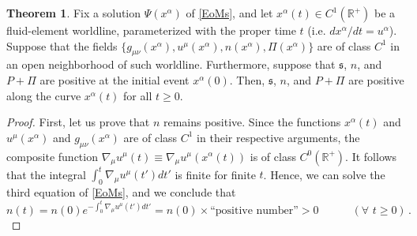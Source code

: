 \documentclass[a4paper, amsfonts, amssymb, amsmath, reprint, showkeys, nofootinbib, twoside,notitlepage,onecolumn]{revtex4-2}
\newcommand{\spc}{\quad \quad \quad}
\newcommand{\s}{{\mathfrak{s}}}
\theoremstyle{definition}
\theoremstyle{theorem}
\newtheorem{theorem}{Theorem}
\theoremstyle{corollary}
\begin{document}
\begin{theorem}\label{theo1} 
Fix a solution $\Psi(x^\alpha)$ of \eqref{EoMs}, and let $x^\alpha(t) \in C^1(\mathbb{R}^+)$ be a fluid-element worldline, parameterized with the proper time $t$ (i.e. $dx^\alpha/dt=u^\alpha$). Suppose that the fields $\{g_{\mu \nu}(x^\alpha), u^\mu(x^\alpha),n(x^\alpha),\Pi(x^\alpha) \}$ are of class $C^1$ in an open neighborhood of such worldline. Furthermore, suppose that $\s$, $n$, and $P{+}\Pi$ are positive at the initial event $x^\alpha(0)$. Then, $\s$, $n$, and $P{+}\Pi$ are positive along the curve $x^\alpha(t)$ for all $t\geq 0$.
\end{theorem}
\begin{proof}
First, let us prove that $n$ remains positive. Since the functions $x^\alpha(t)$ and $u^\mu(x^\alpha)$ and $g_{\mu \nu}(x^\alpha)$ are of class $C^1$ in their respective arguments, the composite function $\nabla_\mu u^\mu(t)\equiv \nabla_\mu u^\mu(x^\alpha(t))$ is of class $C^0(\mathbb{R}^+)$. It follows that the integral $\int_0^t \nabla_\mu u^\mu(t')dt'$ is finite for finite $t$. Hence, we can solve the third equation of \eqref{EoMs}, and we conclude that 
\begin{equation}\label{npositive}
n(t)=n(0)e^{-\int_0^t \nabla_\mu u^\mu(t')dt'}=n(0)\times \text{``positive number''} >0  \spc (\forall \, \, t \geq 0)\, .
\end{equation}


\end{proof}
\end{document}
